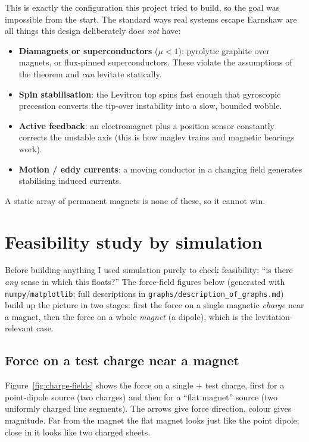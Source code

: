 \documentclass[11pt]{article}
\begin{document}
This is exactly the configuration this project tried to build, so the goal was
impossible from the start. The standard ways real systems escape Earnshaw are
all things this design deliberately does \emph{not} have:
%
\begin{itemize}
  \item \textbf{Diamagnets or superconductors} ($\mu<1$): pyrolytic graphite
        over magnets, or flux-pinned superconductors. These violate the
        assumptions of the theorem and \emph{can} levitate statically.
  \item \textbf{Spin stabilisation}: the Levitron top spins fast enough that
        gyroscopic precession converts the tip-over instability into a slow,
        bounded wobble.
  \item \textbf{Active feedback}: an electromagnet plus a position sensor
        constantly corrects the unstable axis (this is how maglev trains and
        magnetic bearings work).
  \item \textbf{Motion / eddy currents}: a moving conductor in a changing field
        generates stabilising induced currents.
\end{itemize}
%
A static array of permanent magnets is none of these, so it cannot win.

\section{Feasibility study by simulation}\label{sec:sim}

Before building anything I used simulation purely to check feasibility: ``is
there \emph{any} sense in which this floats?'' The force-field figures below
(generated with \texttt{numpy}/\texttt{matplotlib}; full descriptions in
\texttt{graphs/description\_of\_graphs.md}) build up the picture in two stages:
first the force on a single magnetic \emph{charge} near a magnet, then the force
on a whole \emph{magnet} (a dipole), which is the levitation-relevant case.

\subsection{Force on a test charge near a magnet}

Figure~\ref{fig:charge-fields} shows the force on a single $+$ test charge,
first for a point-dipole source (two charges) and then for a ``flat magnet''
source (two uniformly charged line segments). The arrows give force direction,
colour gives magnitude. Far from the magnet the flat magnet looks just like the
point dipole; close in it looks like two charged sheets.
\end{document}
